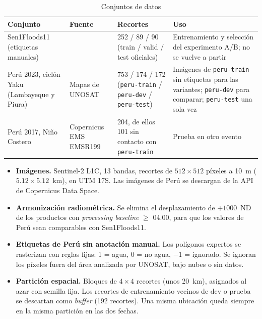 \begin{table}[H]
    \centering
    \small
    \caption{Conjuntos de datos}
    \label{tab:sprint_datos}
    \begin{tabular}{|p{3.4cm}|p{3.4cm}|p{3.4cm}|p{4.0cm}|}
        \hline
        \textbf{Conjunto} & \textbf{Fuente} & \textbf{Recortes} & \textbf{Uso} \\
        \hline
        Sen1Floods11 (etiquetas manuales) & \cite{bonafilia_sen1floods11_2020} & 252 / 89 / 90 (train / valid / test oficiales) & Entrenamiento y selección del experimento A/B; no se vuelve a partir \\
        \hline
        Perú 2023, ciclón Yaku (Lambayeque y Piura) & Mapas de UNOSAT \cite{unosat_lambayequepiura22mar_2023, unosat_lambayequepiura1apr_2023} & 753 / 174 / 172 (\texttt{peru-\allowbreak{}train} / \texttt{peru-\allowbreak{}dev} / \texttt{peru-\allowbreak{}test}) & Imágenes de \texttt{peru-\allowbreak{}train} sin etiquetas para las variantes; \texttt{peru-\allowbreak{}dev} para comparar; \texttt{peru-\allowbreak{}test} una sola vez \\
        \hline
        Perú 2017, Niño Costero & Copernicus EMS EMSR199 \cite{copernicus_emsr199_2017} & 204, de ellos 101 sin contacto con \texttt{peru-\allowbreak{}train} & Prueba en otro evento \\
        \hline
    \end{tabular}
\end{table}

\begin{itemize}
    \item \textbf{Imágenes.} Sentinel-2 L1C, 13 bandas, recortes de $512 \times 512$ píxeles a 10~m
    ($5.12 \times 5.12$~km), en UTM 17S. Las imágenes de Perú se descargan de la API de Copernicus
    Data Space.
    \item \textbf{Armonización radiométrica.} Se elimina el desplazamiento de $+1000$~ND de los
    productos con \textit{processing baseline} $\geq$ 04.00, para que los valores de Perú sean
    comparables con Sen1Floods11.
    \item \textbf{Etiquetas de Perú sin anotación manual.} Los polígonos expertos se rasterizan con
    reglas fijas: 1 = agua, 0 = no agua, $-1$ = ignorado. Se ignoran los píxeles fuera del área
    analizada por UNOSAT, bajo nubes o sin datos.
    \item \textbf{Partición espacial.} Bloques de $4 \times 4$ recortes (unos 20~km), asignados al
    azar con semilla fija. Los recortes de entrenamiento vecinos de dev o prueba se descartan como
    \textit{buffer} (192 recortes). Una misma ubicación queda siempre en la misma partición en las
    dos fechas.
\end{itemize}

